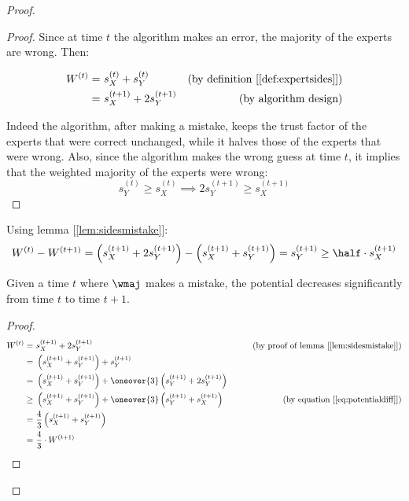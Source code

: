 \begin{proof}
    \begin{proof}
        Since at time $t$ the algorithm makes an error, the majority of the experts are wrong. Then:
        
        \begin{align*}\label{eq:wtj-1}
                W^{(t)}
            =&\ s_X^{(t)} + s_Y^{(t)}   & \text{(by definition [\ref{def:expertsides}])} \\
            =&\ s_X^{(t + 1)} + 2s_Y^{(t + 1)}          & \text{(by algorithm design)} \\
        \end{align*}

        Indeed the algorithm, after making a mistake, keeps the trust factor of the experts that were correct unchanged, while it halves those of the experts that were wrong. Also, since the algorithm makes the wrong guess at time $t$, it implies that the weighted majority of the experts were wrong:
        \[
            s_Y^{(t)} \geq s_X^{(t)} \implies 2 s_Y^{(t + 1)} \geq s_X^{(t + 1)}
        \]
    \end{proof}

    Using lemma [\ref{lem:sidesmistake}]:
    \begin{equation}\label{eq:potentialdiff}
        W^{(t)} - W^{(t + 1)} = \left( s_X^{(t + 1)} + 2 s_Y^{(t + 1)} \right) - \left( s_X^{(t + 1)} + s_Y^{(t + 1)} \right) = s_Y^{(t + 1)} \geq \half \cdot s_X^{(t + 1)}
    \end{equation}

    \begin{lemma}\label{cor:exp-wm-2}
        Given a time $t$ where $\wmaj$ makes a mistake, the potential decreases significantly from time $t$ to time $t + 1$.
    \end{lemma}
        
    \begin{proof}
        \begin{align*}
                   W^{(t)}
               =&\ s_X^{(t + 1)} + 2s_Y^{(t + 1)}                                                                            & \tag{by proof of lemma [\ref{lem:sidesmistake}]} \\
               =&\ \left( s_X^{(t + 1)} + s_Y^{(t + 1)} \right) + s_Y^{(t + 1)}                                              & \\
               =&\ \left( s_X^{(t + 1)} + s_Y^{(t + 1)} \right) + \oneover{3} \left( s_Y^{(t + 1)} + 2 s_Y^{(t + 1)} \right) & \\
            \geq&\ \left( s_X^{(t + 1)} + s_Y^{(t + 1)} \right) + \oneover{3} \left( s_Y^{(t + 1)} + s_X^{(t + 1)} \right)   & \tag{by equation [\ref{eq:potentialdiff}]} \\
               =&\ \frac{4}{3} \left( s_X^{(t + 1)} + s_Y^{(t + 1)} \right)                                                  & \\
               =&\ \frac{4}{3} \cdot W^{(t + 1)}                                                                             & 
        \end{align*}
        

\end{proof}
\end{proof}

